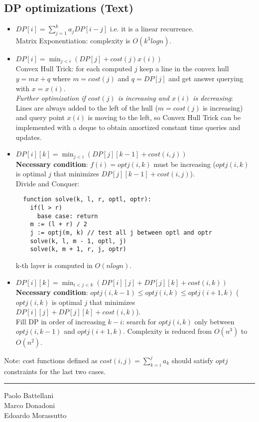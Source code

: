 \documentclass[9pt]{extarticle}
\begin{document}
\begin{multicols*}{3}
\subsection{DP optimizations (Text)}
\begin{itemize}
\item $DP[i] = \displaystyle \sum_{j = 1}^{k} a_{j}DP[i - j]$ i.e. it is a linear recurrence. \\
 Matrix Exponentiation: complexity is $O(k^3logn)$.
\item $DP[i] = \displaystyle \min_{j < i} (DP[j] + cost(j)x(i))$ \\
 Convex Hull Trick: for each computed $j$ keep a line in the convex hull $y = mx + q$
 where $m = cost(j)$ and $q = DP[j]$ and get answer querying with $x = x(i)$. \\
 \textit{Further optimization if $cost(j)$ is increasing and $x(i)$ is decreasing}: \\
 Lines are always added to the left of the hull ($m = cost(j)$ is increasing)
 and query point $x(i)$ is moving to the left, so Convex Hull Trick can be
 implemented with a deque to obtain amortized constant time queries and updates.
\item $DP[i][k] = \displaystyle \min_{j < i} (DP[j][k - 1] + cost(i, j))$ \\
 \textbf{Necessary condition}: $f(i) = optj(i, k)$ must be increasing ($optj(i, k)$ is optimal $j$ that minimizes
 $DP[j][k - 1] + cost(i, j)$). \\
 Divide and Conquer:
 \begin{lstlisting}
  function solve(k, l, r, optl, optr):
    if(l > r)
      base case: return
    m := (l + r) / 2
    j := optj(m, k) // test all j between optl and optr
    solve(k, l, m - 1, optl, j)
    solve(k, m + 1, r, j, optr)
 \end{lstlisting}
 k-th layer is computed in $O(nlogn)$.
\item $DP[i][k] = \displaystyle \min_{i < j < k} (DP[i][j] + DP[j][k] + cost(i, k))$ \\
 \textbf{Necessary condition}: $optj(i, k - 1) \leq optj(i, k) \leq optj(i + 1, k)$ ($optj(i, k)$ is optimal $j$ that minimizes
 $DP[i][j] + DP[j][k] + cost(i, k)$). \\
 Fill DP in order of increasing $k - i$: search for $optj(i, k)$ only between $optj(i, k - 1)$ and $optj(i + 1, k)$.
 Complexity is reduced from $O(n^3)$ to $O(n^2)$.
\end{itemize}
Note: cost functions defined as $cost(i, j) = \displaystyle \sum_{k = i}^{j} a_{k}$ should satisfy $optj$ constraints for the last two cases.

\noindent\rule{9cm}{0.3pt}

Paolo Battellani \\
Marco Donadoni \\
Edoardo Morassutto

\end{multicols*}
\end{document}
